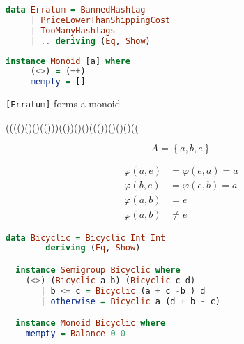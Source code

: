 \documentclass[10pt]{beamer}
\begin{document}
\begin{frame}[fragile]
  \begin{lstlisting}[language=haskell]
  data Erratum = BannedHashtag 
     | PriceLowerThanShippingCost 
     | TooManyHashtags 
     | .. deriving (Eq, Show)
  \end{lstlisting}
\end{frame}

\begin{frame}[fragile]
  \begin{lstlisting}[language=haskell]
  instance Monoid [a] where
     (<>) = (++)
     mempty = []
  \end{lstlisting}
\end{frame}


\begin{frame}[fragile]
  \verb|[Erratum]| forms a monoid
\end{frame}

\begin{frame}
  (((()()()(()))(())()()((())()()()((
\end{frame}
\begin{frame}[fragile]
  \begin{dmath*}
    A = \left\{ a,b,e \right\}
  \end{dmath*}
\end{frame}

\begin{frame}[fragile]
  \begin{align*}
    \varphi(a, e) &= \varphi(e, a)  = a\\
    \varphi(b, e) &= \varphi(e, b)  = a\\
    \varphi(a,b) &= e \\
    \varphi(a,b) &\neq e 
  \end{align*}
\end{frame}


\begin{frame}[fragile]
  \begin{lstlisting}[language=haskell]
  data Bicyclic = Bicyclic Int Int 
        deriving (Eq, Show)

  instance Semigroup Bicyclic where
    (<>) (Bicyclic a b) (Bicyclic c d)
       | b <= c = Bicyclic (a + c -b ) d
       | otherwise = Bicyclic a (d + b - c)

  instance Monoid Bicyclic where
    mempty = Balance 0 0
  \end{lstlisting}
\end{frame}
\end{document}
